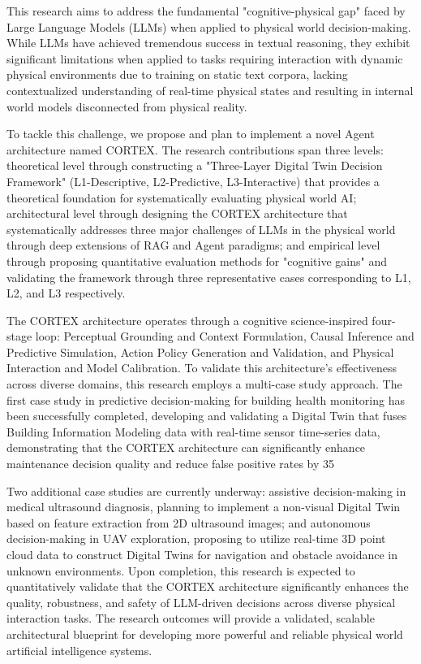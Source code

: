 
This research aims to address the fundamental "cognitive-physical gap" faced by Large Language Models (LLMs) when applied to physical world decision-making. While LLMs have achieved tremendous success in textual reasoning, they exhibit significant limitations when applied to tasks requiring interaction with dynamic physical environments due to training on static text corpora, lacking contextualized understanding of real-time physical states and resulting in internal world models disconnected from physical reality.

To tackle this challenge, we propose and plan to implement a novel Agent architecture named CORTEX. The research contributions span three levels: theoretical level through constructing a "Three-Layer Digital Twin Decision Framework" (L1-Descriptive, L2-Predictive, L3-Interactive) that provides a theoretical foundation for systematically evaluating physical world AI; architectural level through designing the CORTEX architecture that systematically addresses three major challenges of LLMs in the physical world through deep extensions of RAG and Agent paradigms; and empirical level through proposing quantitative evaluation methods for "cognitive gains" and validating the framework through three representative cases corresponding to L1, L2, and L3 respectively.

The CORTEX architecture operates through a cognitive science-inspired four-stage loop: Perceptual Grounding and Context Formulation, Causal Inference and Predictive Simulation, Action Policy Generation and Validation, and Physical Interaction and Model Calibration. To validate this architecture's effectiveness across diverse domains, this research employs a multi-case study approach. The first case study in predictive decision-making for building health monitoring has been successfully completed, developing and validating a Digital Twin that fuses Building Information Modeling data with real-time sensor time-series data, demonstrating that the CORTEX architecture can significantly enhance maintenance decision quality and reduce false positive rates by 35%

Two additional case studies are currently underway: assistive decision-making in medical ultrasound diagnosis, planning to implement a non-visual Digital Twin based on feature extraction from 2D ultrasound images; and autonomous decision-making in UAV exploration, proposing to utilize real-time 3D point cloud data to construct Digital Twins for navigation and obstacle avoidance in unknown environments. Upon completion, this research is expected to quantitatively validate that the CORTEX architecture significantly enhances the quality, robustness, and safety of LLM-driven decisions across diverse physical interaction tasks. The research outcomes will provide a validated, scalable architectural blueprint for developing more powerful and reliable physical world artificial intelligence systems.
